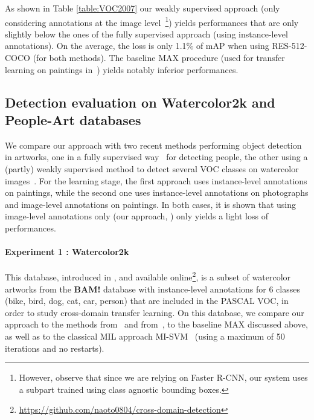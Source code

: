 \documentclass[runningheads]{llncs}
\newcommand\MAX{MAX}
\begin{document}
As shown in Table \ref{table:VOC2007} our weakly supervised approach (only considering annotations at the image level~\footnote{However, observe that since we are relying on Faster R-CNN, our system uses a subpart trained using class agnostic bounding boxes.}) 
yields performances that are only slightly below the ones of the fully supervised approach (using instance-level annotations).
On the average, the loss is only 1.1\% of mAP when using RES-512-COCO (for both methods). The baseline \MAX{} procedure (used for transfer learning on paintings in~\cite{crowley_search_2014}) yields notably inferior performances. 




\subsection{Detection evaluation on Watercolor2k and People-Art databases}

We compare our approach with two recent methods performing object detection in artworks, one in a fully supervised way~\cite{westlake_detecting_2016} for detecting people, the other using a (partly) weakly supervised method to detect several VOC classes on watercolor images~\cite{inoue_crossdomain_2018}. For the learning stage, the first approach uses instance-level annotations on paintings, while the second one uses instance-level annotations on photographs and image-level annotations on paintings. In both cases, it is shown that using image-level annotations only (our approach, \MIL{}) only yields  a light loss of performances. 

\paragraph{\bf Experiment 1 : Watercolor2k} This database, introduced in \cite{inoue_crossdomain_2018}, and available online\footnote{\url{https://github.com/naoto0804/cross-domain-detection}}, is a subset of watercolor artworks from the \textbf{BAM!} database \cite{wilber_bam_2017}  with instance-level annotations for 6 classes (bike, bird, dog, cat, car, person) that are included in the PASCAL VOC, in order to study cross-domain transfer learning.
On this database, we compare our approach to the methods from~\cite{inoue_crossdomain_2018} and from~\cite{bilen_weakly_2016}, to the baseline \MAX{} discussed above, as well as to the classical MIL approach MI-SVM~\cite{andrews_support_2003} (using a maximum of 50 iterations and no restarts). 
\end{document}
